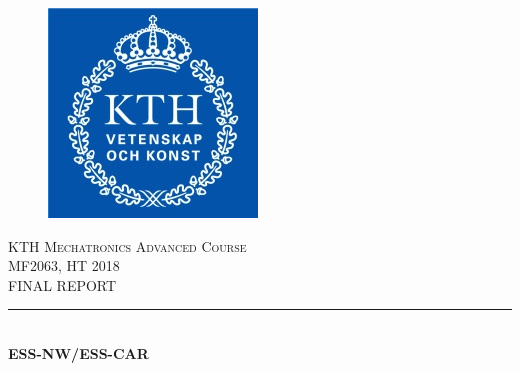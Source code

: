 \documentclass[11pt, titlepage]{article} %
\begin{document}
{} %



\begin{titlepage} %
	\newcommand{\HRule}{\rule{\linewidth}{0.5mm}} %
	
	\center %
	
	
	\begin{figure}
   		\centering
    	\includegraphics[scale=1]{kthLogo.png}
	\end{figure}
	
	\textsc{\LARGE KTH Mechatronics Advanced Course}\\[1cm] %
	
	\textsc{\Large MF2063, HT 2018}\\[0.5cm] %
	
	\textsc{\Large FINAL REPORT}\\[0.5cm] %
	
	
	\HRule\\[0.4cm]
	
	{\huge\bfseries ESS-NW/ESS-CAR}\\[0.4cm] %
	

\end{titlepage}
\end{document}
